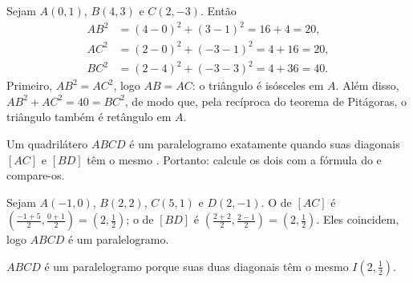 \begin{example}\label{ex:g10:coordgeom:triangle}
Sejam $A(0, 1)$, $B(4, 3)$ e $C(2, -3)$. Então
\begin{align*}
AB^2 &= (4-0)^2 + (3-1)^2 = 16 + 4 = 20, \\
AC^2 &= (2-0)^2 + (-3-1)^2 = 4 + 16 = 20, \\
BC^2 &= (2-4)^2 + (-3-3)^2 = 4 + 36 = 40 .
\end{align*}
Primeiro, $AB^2 = AC^2$, logo $AB = AC$: o triângulo é isósceles em $A$.
Além disso, $AB^2 + AC^2 = 40 = BC^2$, de modo que, pela recíproca do
teorema de Pitágoras, o triângulo também é retângulo em $A$.
\end{example}

\begin{method}\label{met:g10:coordgeom:parallelogram}
Um quadrilátero $ABCD$ é um paralelogramo exatamente quando suas
diagonais $[AC]$ e $[BD]$ têm o mesmo . Portanto: calcule os
dois  com a fórmula do  e compare-os.
\end{method}

\begin{example}\label{ex:g10:coordgeom:parallelogram}
Sejam $A(-1, 0)$, $B(2, 2)$, $C(5, 1)$ e $D(2, -1)$. O  de
$[AC]$ é $\left(\frac{-1+5}{2}, \frac{0+1}{2}\right) = (2, \frac12)$; o
 de $[BD]$ é $\left(\frac{2+2}{2}, \frac{2-1}{2}\right) =
(2, \frac12)$. Eles coincidem, logo $ABCD$ é um paralelogramo.
\end{example}

\begin{omfigure}

{\small $ABCD$ é um paralelogramo porque suas duas diagonais têm o mesmo
 $I(2, \frac12)$.}
\end{omfigure}

